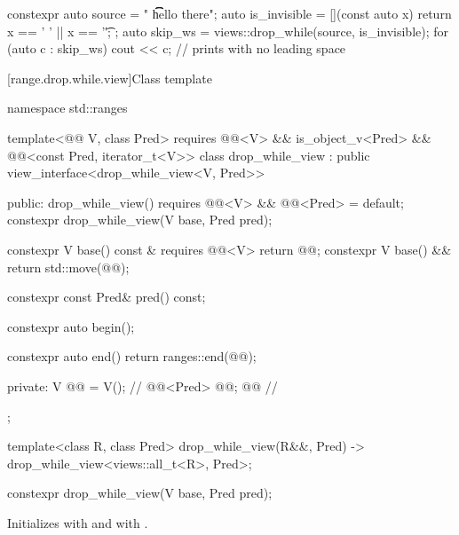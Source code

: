 \pnum
\begin{example}
\begin{codeblock}
constexpr auto source = "  \t   \t   \t   hello there";
auto is_invisible = [](const auto x) { return x == ' ' || x == '\t'; };
auto skip_ws = views::drop_while(source, is_invisible);
for (auto c : skip_ws) {
  cout << c;                                    // prints  with no leading space
}
\end{codeblock}
\end{example}

[range.drop.while.view]{Class template }

%
%
%
\begin{codeblock}
namespace std::ranges {
  template<@@ V, class Pred>
    requires @@<V> && is_object_v<Pred> &&
             @@<const Pred, iterator_t<V>>
  class drop_while_view : public view_interface<drop_while_view<V, Pred>> {
  public:
    drop_while_view() requires @@<V> && @@<Pred> = default;
    constexpr drop_while_view(V base, Pred pred);

    constexpr V base() const & requires @@<V> { return @@; }
    constexpr V base() && { return std::move(@@); }

    constexpr const Pred& pred() const;

    constexpr auto begin();

    constexpr auto end() { return ranges::end(@@); }

  private:
    V @@ = V();                                      // \expos
    @@<Pred> @@; @\itcorr[-1]@                           // \expos
  };

  template<class R, class Pred>
    drop_while_view(R&&, Pred) -> drop_while_view<views::all_t<R>, Pred>;
}
\end{codeblock}

%
\begin{itemdecl}
constexpr drop_while_view(V base, Pred pred);
\end{itemdecl}

\begin{itemdescr}
\pnum
\effects
Initializes  with  and
 with .
\end{itemdescr}


